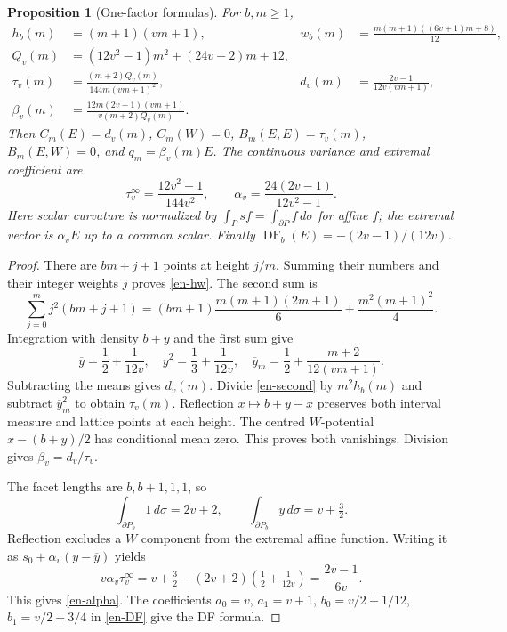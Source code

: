 \documentclass[12pt]{amsart}
\newtheorem{prop}[thm]{Proposition}
\theoremstyle{definition}
\theoremstyle{remark}
\numberwithin{equation}{section}
\DeclareMathOperator{\DF}{DF}
\begin{document}
\begin{prop}[One-factor formulas]\label{en-mom}
For $b,m\geq1$,
\begin{align}\label{en-hw}
h_b(m)&=(m+1)(vm+1),&
w_b(m)&=\frac{m(m+1)((6v+1)m+8)}{12},\\
Q_v(m)&=(12v^2-1)m^2+(24v-2)m+12,\label{en-Q}\\
\tau_v(m)&=\frac{(m+2)Q_v(m)}{144m(vm+1)^2},&
d_v(m)&=\frac{2v-1}{12v(vm+1)},\label{en-td}\\
\beta_v(m)&=\frac{12m(2v-1)(vm+1)}{v(m+2)Q_v(m)}.\label{en-beta}
\end{align}
Then $C_m(E)=d_v(m)$, $C_m(W)=0$, $B_m(E,E)=\tau_v(m)$, $B_m(E,W)=0$, and $q_m=\beta_v(m)E$. The continuous variance and extremal coefficient are
\begin{equation}\label{en-alpha}
\tau_v^\infty=\frac{12v^2-1}{144v^2},\qquad
\alpha_v=\frac{24(2v-1)}{12v^2-1}.
\end{equation}
Here scalar curvature is normalized by $\int_Psf=\int_{\partial P}f\,d\sigma$ for affine $f$; the extremal vector is $\alpha_vE$ up to a common scalar. Finally $\DF_b(E)=-(2v-1)/(12v)$.
\end{prop}
\begin{proof}
There are $bm+j+1$ points at height $j/m$. Summing their numbers and their integer weights $j$ proves \eqref{en-hw}. The second sum is
\begin{equation}\label{en-second}
\sum_{j=0}^mj^2(bm+j+1)
=(bm+1)\frac{m(m+1)(2m+1)}6+\frac{m^2(m+1)^2}4.
\end{equation}
Integration with density $b+y$ and the first sum give
\[
\overline y=\frac12+\frac1{12v},\quad
\overline{y^2}=\frac13+\frac1{12v},\quad
\overline y_m=\frac12+\frac{m+2}{12(vm+1)}.
\]
Subtracting the means gives $d_v(m)$. Divide \eqref{en-second} by $m^2h_b(m)$ and subtract $\overline y_m^2$ to obtain $\tau_v(m)$. Reflection $x\mapsto b+y-x$ preserves both interval measure and lattice points at each height. The centred $W$-potential $x-(b+y)/2$ has conditional mean zero. This proves both vanishings. Division gives $\beta_v=d_v/\tau_v$.

The facet lengths are $b,b+1,1,1$, so
\[
\int_{\partial P_b}1\,d\sigma=2v+2,\qquad
\int_{\partial P_b}y\,d\sigma=v+\tfrac32.
\]
Reflection excludes a $W$ component from the extremal affine function. Writing it as $s_0+\alpha_v(y-\overline y)$ yields
\[
v\alpha_v\tau_v^\infty
=v+\tfrac32-(2v+2)\left(\tfrac12+\tfrac1{12v}\right)
=\frac{2v-1}{6v}.
\]
This gives \eqref{en-alpha}. The coefficients
$a_0=v$, $a_1=v+1$, $b_0=v/2+1/12$, $b_1=v/2+3/4$
in \eqref{en-DF} give the DF formula.
\end{proof}
\end{document}
